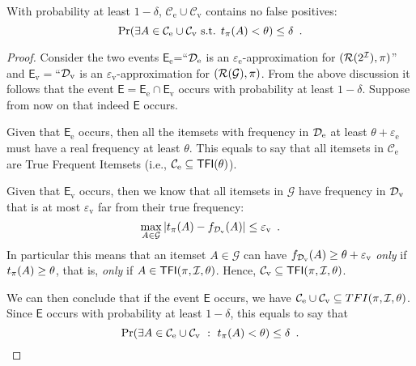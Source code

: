\begin{theorem}
	With probability at least $1-\delta$,
	$\mathcal{C}_\mathrm{e}\cup\mathcal{C}_\mathrm{v}$ contains no false
	positives:
	\[
		\Pr(\exists A\in\mathcal{C}_\mathrm{e}\cup\mathcal{C}_\mathrm{v} \mbox{
		s.t. } t_\pi(A)<\theta)\le\delta\enspace.
	\]
\end{theorem}
\begin{proof}
  Consider the two events $\mathsf{E}_\mathrm{e}$=``${\cal D}_\mathrm{e}$ is an
  $\varepsilon_\mathrm{e}$-approximation for $(\mathcal{R}(2^{\cal I}),\pi)$'' and
  $\mathsf{E}_\mathrm{v}=$``${\cal D}_\mathrm{v}$ is an
  $\varepsilon_\mathrm{v}$-approximation for $(\mathcal{R}(\mathcal{G}),\pi)$. From
  the above discussion it follows that the event
  $\mathsf{E}=\mathsf{E}_\mathrm{e}\cap\mathsf{E}_\mathrm{v}$ occurs with probability at least
  $1-\delta$. Suppose from now on that indeed $\mathsf{E}$ occurs.

  Given that $\mathsf{E}_\mathrm{e}$ occurs, then all the itemsets with
  frequency in ${\cal D}_\mathrm{e}$ at least $\theta+\varepsilon_\mathrm{e}$
  must have a real frequency at least $\theta$. This equals to say that all
  itemsets in $\mathcal{C}_\mathrm{e}$ are True Frequent Itemsets
  (i.e., $\mathcal{C}_\mathrm{e}\subseteq\mathsf{TFI}(\theta)$).

  Given that $\mathsf{E}_\mathrm{v}$ occurs, then we know that all itemsets in
  $\mathcal{G}$ have frequency in ${\cal D}_\mathrm{v}$ that is at most
  $\varepsilon_\mathrm{v}$ far from their true frequency:
  \[
  \max_{A\in\mathcal{G}}\left|t_\pi(A)-f_{{\cal D}_\mathrm{v}}(A)\right|\le\varepsilon_\mathrm{v}\enspace.
  \]
  In particular this means that an itemset $A\in\mathcal{G}$ can have
  $f_{{\cal D}_\mathrm{v}}(A)\ge\theta+\varepsilon_\mathrm{v}$ \emph{only} if
  $t_\pi(A)\ge\theta$, that is, \emph{only} if $A\in\mathsf{TFI}(\pi,{\cal I},\theta)$.
  Hence, $\mathcal{C}_\mathrm{v}\subseteq\mathsf{TFI}(\pi,{\cal I},\theta)$.

  We can then conclude that if the event $\mathsf{E}$ occurs, we have
  $\mathcal{C}_\mathrm{e}\cup \mathcal{C}_\mathrm{v}\subseteq TFI(\pi,{\cal I},\theta)$.
  Since $\mathsf{E}$ occurs with probability at least $1-\delta$, this equals to
  say that
  \[
  \Pr(\exists A\in \mathcal{C}_\mathrm{e}\cup
  \mathcal{C}_\mathrm{v} ~:~ t_\pi(A)<\theta)\le\delta\enspace.\]
\end{proof}


